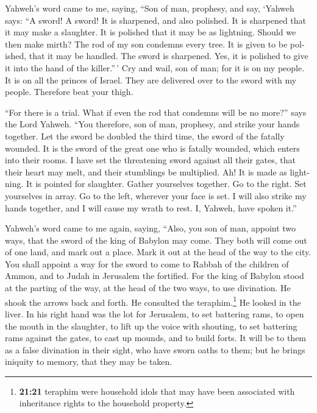 \begin{paracol}{2}
\begin{otherlanguage}{english}
 Yahweh's word came to me, saying,  ``Son of
man, prophesy, and say, `Yahweh says: ``A sword! A sword! It is
sharpened, and also polished.  It is sharpened that it
may make a slaughter. It is polished that it may be as lightning. Should
we then make mirth? The rod of my son condemns every tree.
 It is given to be polished, that it may be handled. The
sword is sharpened. Yes, it is polished to give it into the hand of the
killer.''\,'  Cry and wail, son of man; for it is on my
people. It is on all the princes of Israel. They are delivered over to
the sword with my people. Therefore beat your thigh.

 ``For there is a trial. What if even the rod that
condemns will be no more?'' says the Lord Yahweh.  ``You
therefore, son of man, prophesy, and strike your hands together. Let the
sword be doubled the third time, the sword of the fatally wounded. It is
the sword of the great one who is fatally wounded, which enters into
their rooms.  I have set the threatening sword against
all their gates, that their heart may melt, and their stumblings be
multiplied. Ah! It is made as lightning. It is pointed for slaughter.
 Gather yourselves together. Go to the right. Set
yourselves in array. Go to the left, wherever your face is set.
 I will also strike my hands together, and I will cause
my wrath to rest. I, Yahweh, have spoken it.''

 Yahweh's word came to me again, saying, 
``Also, you son of man, appoint two ways, that the sword of the king of
Babylon may come. They both will come out of one land, and mark out a
place. Mark it out at the head of the way to the city. 
You shall appoint a way for the sword to come to Rabbah of the children
of Ammon, and to Judah in Jerusalem the fortified.  For
the king of Babylon stood at the parting of the way, at the head of the
two ways, to use divination. He shook the arrows back and forth. He
consulted the teraphim.\footnote{\textbf{21:21} teraphim were household
  idols that may have been associated with inheritance rights to the
  household property.} He looked in the liver.  In his
right hand was the lot for Jerusalem, to set battering rams, to open the
mouth in the slaughter, to lift up the voice with shouting, to set
battering rams against the gates, to cast up mounds, and to build forts.
 It will be to them as a false divination in their sight,
who have sworn oaths to them; but he brings iniquity to memory, that
they may be taken.


\end{otherlanguage}
\end{paracol}
